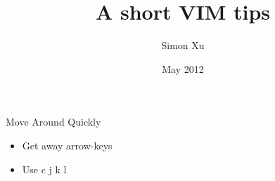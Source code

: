 \documentclass[t]{beamer}
\title{A short VIM tips}
\author{Simon Xu}
\institute{PayPal}
\date{May 2012}
\begin{document}
\begin{frame}[plain]
    \titlepage
\end{frame}

\begin{frame}{Move Around Quickly}
    \begin{itemize}
    \item Get away arrow-keys
        \pause
    \item Use c j k l 
        \pause
    \end{itemize}
\end{frame}
\end{document}
